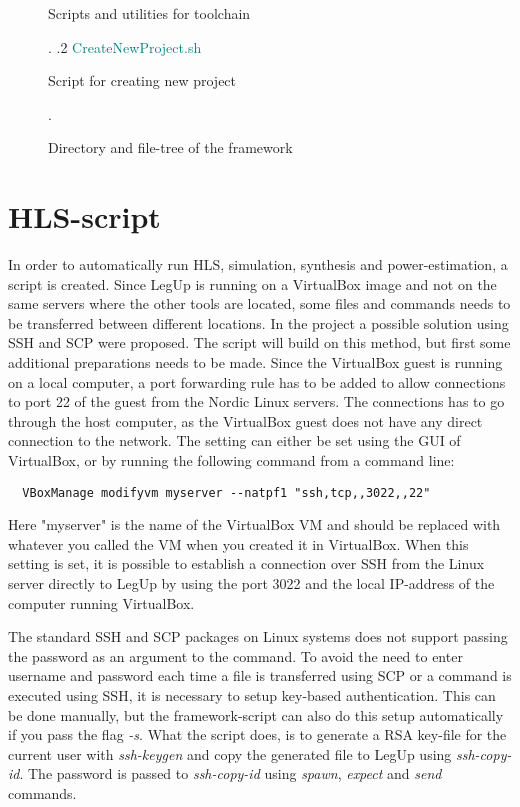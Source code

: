 \begin{figure}
\begin{minipage}{0.99\textwidth}
{\begin{minipage}[t]{6cm}
                                                            Scripts and utilities for toolchain
                                                            \end{minipage}. 
    .2 \textcolor{teal}{CreateNewProject{.}sh} \dotfill \:\:\begin{minipage}[t]{6cm}
                                                            Script for creating new project
                                                            \end{minipage}. 
    }
\end{minipage}
\caption{Directory and file-tree of the framework}
\label{fig:frameworkdirtree}
\end{figure}

\section{HLS-script}
In order to automatically run HLS, simulation, synthesis and power-estimation, a script is created. Since LegUp is running on a VirtualBox image and not on the same servers where the other tools are located, some files and commands needs to be transferred between different locations. In the project \cite{holm2015pro} a possible solution using SSH and SCP were proposed. The script will build on this method, but first some additional preparations needs to be made. Since the VirtualBox guest is running on a local computer, a port forwarding rule has to be added to allow connections to port 22 of the guest from the Nordic Linux servers. The connections has to go through the host computer, as the VirtualBox guest does not have any direct connection to the network. The setting can either be set using the GUI of VirtualBox, or by running the following command from a command line:
\begin{verbatim}
  VBoxManage modifyvm myserver --natpf1 "ssh,tcp,,3022,,22"  
\end{verbatim}
Here "myserver" is the name of the VirtualBox VM and should be replaced with whatever you called the VM when you created it in VirtualBox. When this setting is set, it is possible to establish a connection over SSH from the Linux server directly to LegUp by using the port 3022 and the local IP-address of the computer running VirtualBox.

The standard SSH and SCP packages on Linux systems does not support passing the password as an argument to the command. To avoid the need to enter username and password each time a file is transferred using SCP or a command is executed using SSH, it is necessary to setup key-based authentication. This can be done manually, but the framework-script can also do this setup automatically if you pass the flag \textit{-s}. What the script does, is to generate a RSA key-file for the current user with \textit{ssh-keygen} and copy the generated file to LegUp using \textit{ssh-copy-id}. The password is passed to \textit{ssh-copy-id} using \textit{spawn}, \textit{expect} and \textit{send} commands.


